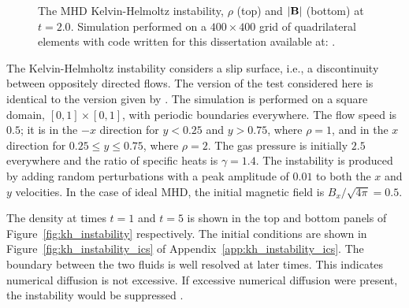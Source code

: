 \begin{figure}[htbp]
\begin{center}
\begin{tabular}{c}
\end{tabular}
\caption{The MHD Kelvin-Helmoltz instability, $\rho$ (top) and $|\mathbf{B}|$ (bottom) at $t=2.0$.  Simulation performed on a $400 \times 400$ grid of quadrilateral elements with code written for this dissertation available at: \protect\gitrepo.}
\end{center} 
\label{fig:kh_instability_mhd}
\figSpace
\end{figure}

The Kelvin-Helmholtz instability \citep{hydro_stability} considers a slip surface, i.e., a discontinuity between oppositely directed flows.  The version of the test considered here is identical to the version given by \citet{url:athena}.  The simulation is performed on a square domain, $[0,1] \times [0,1]$, with periodic boundaries everywhere.  The flow speed is $0.5$; it is in the $-x$ direction for $ y < 0.25$ and $y > 0.75$, where $\rho = 1$, and in the $x$ direction for $0.25 \le y \le 0.75$, where $\rho = 2$.  The gas pressure is initially $2.5$ everywhere and the ratio of specific heats is $\gamma = 1.4$.  The instability is produced by adding random perturbations with a peak amplitude of $0.01$ to both the $x$ and $y$ velocities.  In the case of ideal MHD, the initial magnetic field is $B_x/\sqrt{4\pi} = 0.5$.

The density at times $t=1$ and $t=5$ is shown in the top and bottom panels of Figure~\ref{fig:kh_instability} respectively.  The initial conditions are shown in Figure~\ref{fig:kh_instability_ics} of Appendix~\ref{app:kh_instability_ics}.  The boundary between the two fluids is well resolved at later times.  This indicates numerical diffusion is not excessive.  If excessive numerical diffusion were present, the instability would be suppressed \citep{url:athena}. 


